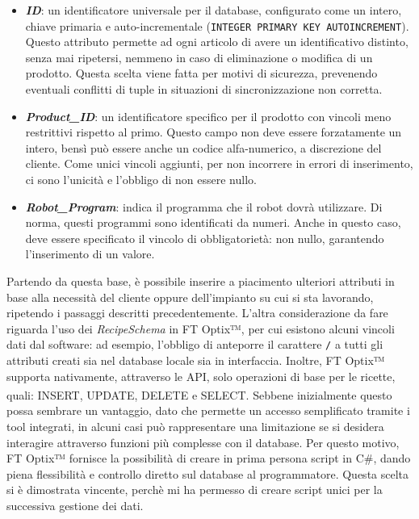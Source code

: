 \begin{itemize}
    \item \textbf{\textit{ID}}: un identificatore universale per il database, configurato come un intero, chiave primaria e auto-incrementale (\verb|INTEGER PRIMARY KEY AUTOINCREMENT|). Questo attributo permette ad ogni articolo di avere un identificativo distinto, senza mai ripetersi, nemmeno in caso di eliminazione o modifica di un prodotto. Questa scelta viene fatta per motivi di sicurezza, prevenendo eventuali conflitti di tuple in situazioni di sincronizzazione non corretta. 
    \item \textbf{\textit{Product\_ID}}: un identificatore specifico per il prodotto con vincoli meno restrittivi rispetto al primo. Questo campo non deve essere forzatamente un intero, bensì può essere anche un codice alfa-numerico, a discrezione del cliente. Come unici vincoli aggiunti, per non incorrere in errori di inserimento, ci sono l'unicità e l'obbligo di non essere nullo.
    \item \textbf{\textit{Robot\_Program}}: indica il programma che il robot dovrà utilizzare. Di norma, questi programmi sono identificati da numeri. Anche in questo caso, deve essere specificato il vincolo di obbligatorietà: non nullo, garantendo l'inserimento di un valore.
\end{itemize}
Partendo da questa base, è possibile inserire a piacimento ulteriori attributi in base alla necessità del cliente oppure dell'impianto su cui si sta lavorando, ripetendo i passaggi descritti precedentemente. 
L'altra considerazione da fare riguarda l'uso dei \textit{RecipeSchema} in FT Optix™, per cui esistono alcuni vincoli dati dal software: ad esempio, l'obbligo di anteporre il carattere \verb|/| a tutti gli attributi creati sia nel database locale sia in interfaccia. Inoltre, FT Optix™ supporta nativamente, attraverso le API, solo operazioni di base per le ricette, quali: INSERT, UPDATE, DELETE e SELECT\textsuperscript{\cite{rockwelloptixsqlquery}}. Sebbene inizialmente questo possa sembrare un vantaggio, dato che permette un accesso semplificato tramite i tool integrati, in alcuni casi può rappresentare una limitazione se si desidera interagire attraverso funzioni più complesse con il database. Per questo motivo, FT Optix™ fornisce la possibilità di creare in prima persona script in C\#, dando piena flessibilità e controllo diretto sul database al programmatore. Questa scelta si è dimostrata vincente, perchè mi ha permesso di creare script unici per la successiva gestione dei dati. 



